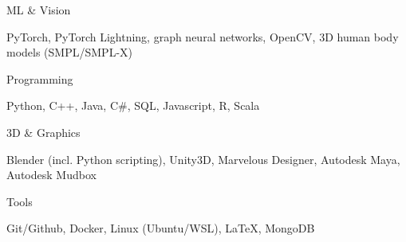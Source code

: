 \documentclass[9pt]{developercv} %
\begin{document}
    \vspace{-6pt}

    \begin{minipage}[t]{0.14\textwidth}
        \small ML \& Vision
    \end{minipage}
    \hfill
    \begin{minipage}[t]{0.81\textwidth}
      PyTorch, PyTorch Lightning, graph neural networks, OpenCV, 3D human body models (SMPL/SMPL-X)
    \end{minipage}
    \vspace{4mm}

    \begin{minipage}[t]{0.14\textwidth}
        \small Programming
    \end{minipage}
    \hfill
    \begin{minipage}[t]{0.81\textwidth}
      Python, C++, Java, C\#, SQL, Javascript, R, Scala
    \end{minipage}
    \vspace{4mm}

    \begin{minipage}[t]{0.14\textwidth}
        \small 3D \& Graphics
    \end{minipage}
    \hfill
    \begin{minipage}[t]{0.81\textwidth}
      Blender (incl. Python scripting), Unity3D, Marvelous Designer, Autodesk Maya, Autodesk Mudbox
    \end{minipage}
    \vspace{4mm}

    \begin{minipage}[t]{0.14\textwidth}
        \small Tools
    \end{minipage}
    \hfill
    \begin{minipage}[t]{0.81\textwidth}
      Git/Github, Docker, Linux (Ubuntu/WSL), LaTeX, MongoDB
    \end{minipage}
    \vspace{4mm}
\end{document}
